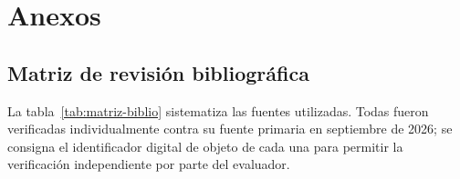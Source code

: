\newpage
\appendix
\section*{Anexos}
\renewcommand{\thesubsection}{\Alph{subsection}}
\setcounter{subsection}{0}

\subsection{Matriz de revisión bibliográfica}
\label{anexo:matriz}

La tabla~\ref{tab:matriz-biblio} sistematiza las fuentes utilizadas. Todas
fueron verificadas individualmente contra su fuente primaria en septiembre de
2026; se consigna el identificador digital de objeto de cada una para permitir
la verificación independiente por parte del evaluador.

